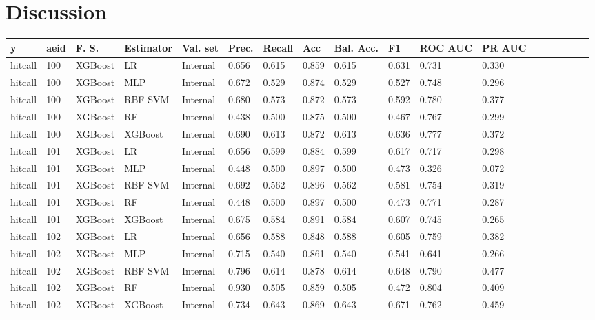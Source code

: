 \section{Discussion}

\begin{longtable}{llllllllllllllllll} \toprule \midrule \small y & \small aeid & \small F. S. & \small Estimator & \small Val. set & \small Prec. & \small Recall & \small Acc & \small Bal. Acc. & \small F1 & \small ROC AUC & \small PR AUC\\ \hline hitcall & 100 & XGBoost & LR & Internal & 0.656 & 0.615 & 0.859 & 0.615 & 0.631 & 0.731 & 0.330\\ hitcall & 100 & XGBoost & MLP & Internal & 0.672 & 0.529 & 0.874 & 0.529 & 0.527 & 0.748 & 0.296\\ hitcall & 100 & XGBoost & RBF SVM & Internal & 0.680 & 0.573 & 0.872 & 0.573 & 0.592 & 0.780 & 0.377\\ hitcall & 100 & XGBoost & RF & Internal & 0.438 & 0.500 & 0.875 & 0.500 & 0.467 & 0.767 & 0.299\\ hitcall & 100 & XGBoost & XGBoost & Internal & 0.690 & 0.613 & 0.872 & 0.613 & 0.636 & 0.777 & 0.372\\ hitcall & 101 & XGBoost & LR & Internal & 0.656 & 0.599 & 0.884 & 0.599 & 0.617 & 0.717 & 0.298\\ hitcall & 101 & XGBoost & MLP & Internal & 0.448 & 0.500 & 0.897 & 0.500 & 0.473 & 0.326 & 0.072\\ hitcall & 101 & XGBoost & RBF SVM & Internal & 0.692 & 0.562 & 0.896 & 0.562 & 0.581 & 0.754 & 0.319\\ hitcall & 101 & XGBoost & RF & Internal & 0.448 & 0.500 & 0.897 & 0.500 & 0.473 & 0.771 & 0.287\\ hitcall & 101 & XGBoost & XGBoost & Internal & 0.675 & 0.584 & 0.891 & 0.584 & 0.607 & 0.745 & 0.265\\ hitcall & 102 & XGBoost & LR & Internal & 0.656 & 0.588 & 0.848 & 0.588 & 0.605 & 0.759 & 0.382\\ hitcall & 102 & XGBoost & MLP & Internal & 0.715 & 0.540 & 0.861 & 0.540 & 0.541 & 0.641 & 0.266\\ hitcall & 102 & XGBoost & RBF SVM & Internal & 0.796 & 0.614 & 0.878 & 0.614 & 0.648 & 0.790 & 0.477\\ hitcall & 102 & XGBoost & RF & Internal & 0.930 & 0.505 & 0.859 & 0.505 & 0.472 & 0.804 & 0.409\\ hitcall & 102 & XGBoost & XGBoost & Internal & 0.734 & 0.643 & 0.869 & 0.643 & 0.671 & 0.762 & 0.459\\ \bottomrule \end{longtable}












